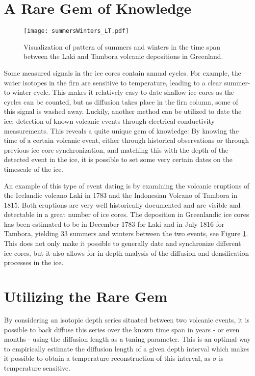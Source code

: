 \documentclass[../../CompleteThesis2/Complete_2ndDraft]{subfiles}
\begin{document}
	
\section[A Rare Gem]{A Rare Gem of Knowledge}
\label{Sec:RareGem}
\begin{figure}
	\centering
	\texttt{[image: summersWinters\_LT.pdf]}
	\caption[Summers and Winters between Laki and Tambora]{Visualization of pattern of summers and winters in the time span between the Laki and Tambora volcanic depositions in Greenland.}
	\label{Fig:LakiTamb_SummerWinter}
\end{figure}
	
Some measured signals in the ice cores contain annual cycles. For example, the water isotopes in the firn are sensitive to temperature, leading to a clear summer-to-winter cycle. This makes it relatively easy to date shallow ice cores as the cycles can be counted, but as diffusion takes place in the firn column, some of this signal is washed away. Luckily, another method can be utilized to date the ice: detection of known volcanic events through electrical conductivity measurements. This reveals a quite unique gem of knowledge: By knowing the time of a certain volcanic event, either through historical observations or through previous ice core synchronization, and matching this with the depth of the detected event in the ice, it is possible to set some very certain dates on the timescale of the ice. 

An example of this type of event dating is by examining the volcanic eruptions of the Icelandic volcano Laki in 1783 and the Indonesian Volcano of Tambora in 1815. Both eruptions are very well historically documented and are visible and detectable in a great number of ice cores. The deposition in Greenlandic ice cores has been estimated to be in December 1783 for Laki and in July 1816 for Tambora, yielding 33 summers and winters between the two events, see Figure \ref{Fig:LakiTamb_SummerWinter}. This does not only make it possible to generally date and synchronize different ice cores, but it also allows for in depth analysis of the diffusion and densification processes in the ice.
	

	
	
\section[Using the Rare Gem]{Utilizing the Rare Gem}
\label{Sec:UtilizinGem}
By considering an isotopic depth series situated between two volcanic events, it is possible to back diffuse this series over the known time span in years - or even months - using the diffusion length as a tuning parameter. This is an optimal way to empirically estimate the diffusion length of a given depth interval which makes it possible to obtain a temperature reconstruction of this interval, as $\sigma$ is temperature sensitive.
\end{document}
